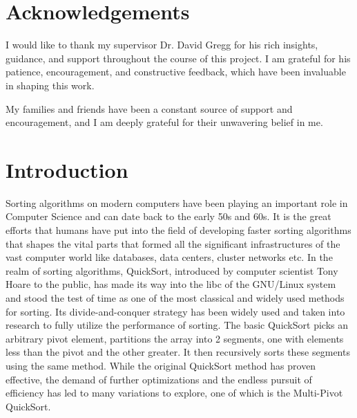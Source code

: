 \documentclass[a4paper,oneside,12pt]{book}
\begin{document}



\newpage
\onehalfspacing\raggedright %

\section*{\Huge\textcolor{tcd_blue}{Acknowledgements}}
I would like to thank my supervisor Dr. David Gregg for his rich insights, guidance, and support throughout the course of this project.
I am grateful for his patience, encouragement, and constructive feedback, which have been invaluable in shaping this work.

My families and friends have been a constant source of support and encouragement, and I am deeply grateful for their unwavering belief in me.

\newpage \tableofcontents
\clearpage

\section{Introduction}
Sorting algorithms on modern computers have been playing an important role in Computer Science and can date back to the early 50s and 60s. 
It is the great efforts that humans have put into the field of developing faster sorting algorithms that shapes the vital parts that formed
all the significant infrastructures of the vast computer world like databases, data centers, cluster networks etc.
In the realm of sorting algorithms, QuickSort, introduced by computer scientist Tony Hoare \cite{HoareQuickSort} to the public,
has made its way into the libc of the GNU/Linux system and stood the test of time as one of the most classical and widely used methods for sorting. 
Its divide-and-conquer strategy has been widely used and taken into research to fully utilize the performance of sorting.
The basic QuickSort picks an arbitrary pivot element,
partitions the array into 2 segments, one with elements less than the pivot and the other greater. 
It then recursively sorts these segments using the same method. While the original QuickSort method has proven effective,
the demand of further optimizations and the endless pursuit of efficiency has led to many variations to explore, one of which is the Multi-Pivot QuickSort. 
\end{document}
